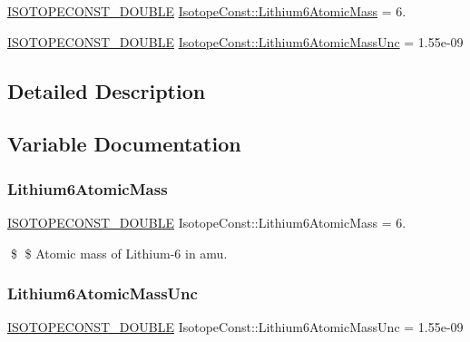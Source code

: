 \begin{DoxyCompactItemize}
\item 
\mbox{\hyperlink{group___isotope_const-_macros_ga8f45a7272ce02c0b4c65c44636ed719a}{I\+S\+O\+T\+O\+P\+E\+C\+O\+N\+S\+T\+\_\+\+D\+O\+U\+B\+LE}} \mbox{\hyperlink{group___isotope_const-_lithium-_li6_ga834121041f547772ae52e398c3d29480}{Isotope\+Const\+::\+Lithium6\+Atomic\+Mass}} = 6.
\item 
\mbox{\hyperlink{group___isotope_const-_macros_ga8f45a7272ce02c0b4c65c44636ed719a}{I\+S\+O\+T\+O\+P\+E\+C\+O\+N\+S\+T\+\_\+\+D\+O\+U\+B\+LE}} \mbox{\hyperlink{group___isotope_const-_lithium-_li6_ga65e8b8d97cee62a66c1834480ba3c6ae}{Isotope\+Const\+::\+Lithium6\+Atomic\+Mass\+Unc}} = 1.\+55e-\/09
\end{DoxyCompactItemize}


\subsection{Detailed Description}


\subsection{Variable Documentation}
\mbox{\label{group___isotope_const-_lithium-_li6_ga834121041f547772ae52e398c3d29480}} 
\subsubsection{\texorpdfstring{Lithium6\+Atomic\+Mass}{Lithium6AtomicMass}}
{\footnotesize\ttfamily \mbox{\hyperlink{group___isotope_const-_macros_ga8f45a7272ce02c0b4c65c44636ed719a}{I\+S\+O\+T\+O\+P\+E\+C\+O\+N\+S\+T\+\_\+\+D\+O\+U\+B\+LE}} Isotope\+Const\+::\+Lithium6\+Atomic\+Mass = 6.}

\$ \$ Atomic mass of Lithium-\/6 in amu. \mbox{\label{group___isotope_const-_lithium-_li6_ga65e8b8d97cee62a66c1834480ba3c6ae}} 
\subsubsection{\texorpdfstring{Lithium6\+Atomic\+Mass\+Unc}{Lithium6AtomicMassUnc}}
{\footnotesize\ttfamily \mbox{\hyperlink{group___isotope_const-_macros_ga8f45a7272ce02c0b4c65c44636ed719a}{I\+S\+O\+T\+O\+P\+E\+C\+O\+N\+S\+T\+\_\+\+D\+O\+U\+B\+LE}} Isotope\+Const\+::\+Lithium6\+Atomic\+Mass\+Unc = 1.\+55e-\/09}

